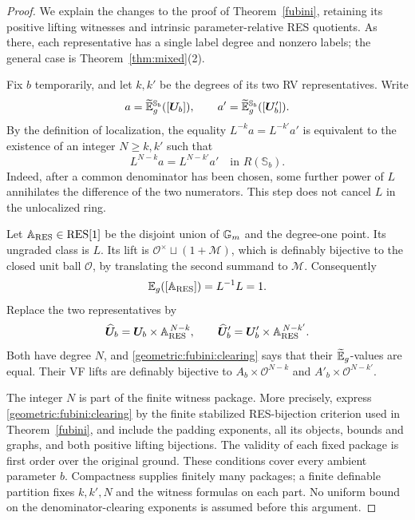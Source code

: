 \begin{proof}
We explain the changes to the proof of Theorem~\ref{fubini}, retaining its
positive lifting witnesses and intrinsic parameter-relative RES quotients.
As there, each representative has a single label degree and nonzero
labels; the general case is Theorem~\ref{thm:mixed}(2).

Fix $b$ temporarily, and let $k,k'$ be the degrees of its two RV
representatives. Write
\[
 a=\widetilde{\mathbb E}_g^{\mathbb S_b}([\bm U_b]),\qquad
 a'=\widetilde{\mathbb E}_g^{\mathbb S_b}([\bm U'_b]).
\]
By the definition of localization, the equality $L^{-k}a=L^{-k'}a'$
is equivalent to the existence of an integer $N\geq k,k'$ such that
\begin{equation}\label{geometric:fubini:clearing}
 L^{N-k}a=L^{N-k'}a'\quad\text{in }R(\mathbb S_b).
\end{equation}
Indeed, after a common denominator has been chosen, some further power
of $L$ annihilates the difference of the two numerators. This step does
not cancel $L$ in the unlocalized ring.

Let $\bm{\mathbb A}_{\mathrm{RES}}\in\mathrm{RES}[1]$ be the disjoint union of
$\mathbb G_m$ and the degree-one point. Its ungraded class is $L$.
Its lift is $\mathcal O^\times\sqcup(1+\mathcal M)$, which is definably
bijective to the closed unit ball $\mathcal O$, by translating the second
summand to $\mathcal M$. Consequently
\[
 \mathbb E_g([\bm{\mathbb A}_{\mathrm{RES}}])=L^{-1}L=1.
\]
Replace the two representatives by
\[
 \widehat{\bm U}_b=\bm U_b\times\bm{\mathbb A}_{\mathrm{RES}}^{\,N-k},
 \qquad
 \widehat{\bm U}'_b=\bm U'_b\times\bm{\mathbb A}_{\mathrm{RES}}^{\,N-k'}.
\]
Both have degree $N$, and \eqref{geometric:fubini:clearing} says that their $\widetilde{\mathbb E}_g$-values
are equal. Their VF lifts are definably bijective to
$A_b\times\mathcal O^{N-k}$ and $A'_b\times\mathcal O^{N-k'}$.

The integer $N$ is part of the finite witness package. More precisely,
express \eqref{geometric:fubini:clearing} by the finite stabilized RES-bijection criterion
used in Theorem~\ref{fubini}, and include the padding exponents, all its objects,
bounds and graphs, and both positive lifting bijections. The validity of
each fixed package is first order over the original ground. These
conditions cover every ambient parameter $b$. Compactness supplies
finitely many packages; a finite definable partition fixes $k,k',N$ and
the witness formulas on each part. No uniform bound on the
denominator-clearing exponents is assumed before this argument.


\end{proof}
